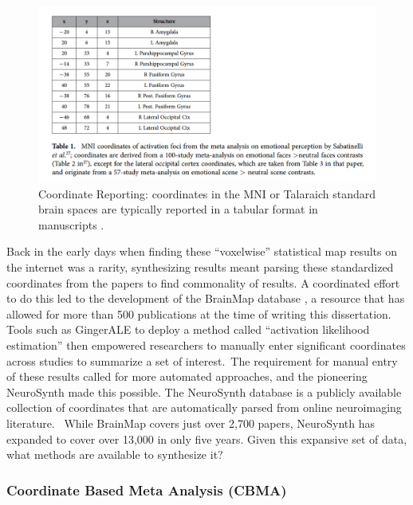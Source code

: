 \documentclass{report}
\begin{document}
\begin{figure}[ht!]
\begin{center}
\includegraphics[width=15cm]{images/figure11.png}
\end{center}
\caption{\label{fig:11} Coordinate Reporting: coordinates in the MNI or Talaraich standard brain spaces are typically reported in a tabular format in manuscripts \cite{Boubela2015-ap}.}
\end{figure}

Back in the early days when finding these ``voxelwise'' statistical map
results on the internet was a rarity, synthesizing results meant parsing
these standardized coordinates from the papers to find commonality of
results. A coordinated effort to do this led to the development of the
BrainMap database \cite{Laird2005-gm},
a resource that has allowed for more than 500 publications at the time
of writing this dissertation. Tools such as GingerALE \cite{Brown2005-sb} to
deploy a method called ``activation likelihood estimation'' \cite{Eickhoff2012-iw}
then empowered researchers to manually enter significant coordinates across
studies to summarize a set of interest.~The requirement for manual entry
of these results called for more automated approaches, and the
pioneering NeuroSynth \cite{Yarkoni2011-rg} made
this possible. The NeuroSynth database is a publicly available
collection of coordinates that are automatically parsed from online
neuroimaging literature. ~While BrainMap covers just over 2,700 papers,
NeuroSynth has expanded to cover over 13,000 in only five years. Given
this expansive set of data, what methods are available to synthesize it?

\subsubsection{Coordinate Based Meta Analysis (CBMA)}
\end{document}
